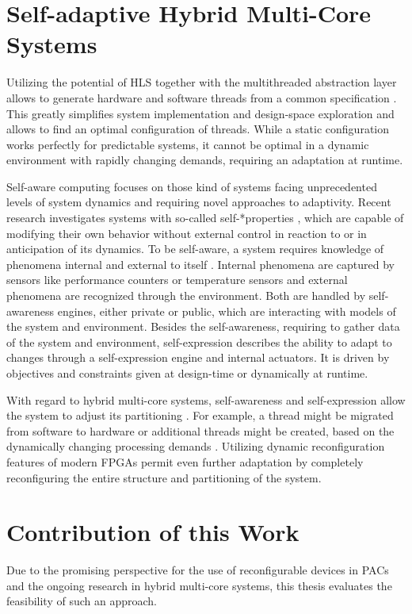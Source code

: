 \section{Self-adaptive Hybrid Multi-Core Systems}
Utilizing the potential of \ac{HLS} together with the multithreaded
abstraction layer allows to generate hardware and software threads from a
common specification \citep{CBN11}. This greatly simplifies system
implementation and design-space exploration and allows to find an optimal
configuration of threads. While a static configuration works perfectly for
predictable systems, it cannot be optimal in a dynamic environment with
rapidly changing demands, requiring an adaptation at runtime.

Self-aware computing focuses on those kind of systems facing unprecedented
levels of system dynamics and requiring novel approaches to adaptivity. Recent
research investigates systems with so-called self-*properties \citep{SMC11},
which are capable of modifying their own behavior without external control in
reaction to or in anticipation of its dynamics. To be self-aware, a system
requires knowledge of phenomena internal and external to itself \citep{LCP11}.
Internal phenomena are captured by sensors like performance counters or
temperature sensors and external phenomena are recognized through the
environment. Both are handled by self-awareness engines, either private or
public, which are interacting with models of the system and environment.
Besides the self-awareness, requiring to gather data of the system and
environment, self-expression describes the ability to adapt to changes through
a self-expression engine and internal actuators. It is driven by objectives
and constraints given at design-time or dynamically at runtime.

With regard to hybrid multi-core systems, self-awareness and self-expression
allow the system to adjust its partitioning \citep{AHL14}. For example, a
thread might be migrated from software to hardware or additional threads might
be created, based on the dynamically changing processing demands
\citep{HLP09}. Utilizing dynamic reconfiguration features of modern \acp{FPGA}
permit even further adaptation by completely reconfiguring the entire
structure and partitioning of the system.

\section{Contribution of this Work}
Due to the promising perspective for the use of reconfigurable devices in
\acp{PAC} and the ongoing research in hybrid multi-core systems, this thesis
evaluates the feasibility of such an approach.

